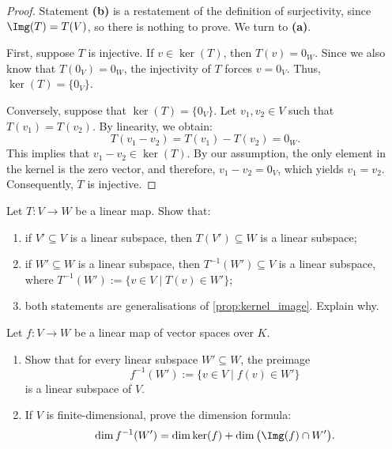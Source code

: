 \begin{proof}
Statement \textbf{(b)} is a restatement of the definition of surjectivity, since $\Img(T) = T(V)$, so there is nothing to prove. We turn to \textbf{(a)}.

First, suppose $T$ is injective. If $v \in \ker(T)$, then $T(v) = 0_W$. Since we also know that $T(0_V) = 0_W$, the injectivity of $T$ forces $v = 0_V$. Thus, $\ker(T) = \{0_V\}$.

Conversely, suppose that $\ker(T) = \{0_V\}$. Let $v_1, v_2 \in V$ such that $T(v_1) = T(v_2)$. By linearity, we obtain:
\[
T(v_1 - v_2) = T(v_1) - T(v_2) = 0_W.
\]
This implies that $v_1 - v_2 \in \ker(T)$. By our assumption, the only element in the kernel is the zero vector, and therefore, $v_1 - v_2 = 0_V$, which yields $v_1 = v_2$. Consequently, $T$ is injective.
\end{proof}

\begin{exercise}
\label{exc:images_preimages_subspaces}
Let $T: V \to W$ be a linear map. Show that:
\begin{enumerate}[label=\textbf{(\alph*)}]
    \item if $V' \subseteq V$ is a linear subspace, then $T(V') \subseteq W$ is a linear subspace;
    \item if $W' \subseteq W$ is a linear subspace, then $T^{-1}(W') \subseteq V$ is a linear subspace, where $T^{-1}(W') := \{v \in V \mid T(v) \in W'\}$;
    \item both statements are generalisations of \cref{prop:kernel_image}. Explain why.
\end{enumerate}
\end{exercise}

\begin{exercise}
\label{exc:preimage_subspace_dimension_formula}
Let $f \colon V \to W$ be a linear map of vector spaces over $K$.
\begin{enumerate}
    \item Show that for every linear subspace $W' \subseteq W$, the preimage
    \[
    f^{-1}(W') := \{v \in V \mid f(v) \in W'\}
    \]
    is a linear subspace of $V$.
    \item If $V$ is finite-di\-men\-sional, prove the dimension formula:
    \[
    \dim f^{-1}(W') = \dim \ker(f) + \dim\big(\Img(f) \cap W'\big).
    \]
\end{enumerate}
\end{exercise}

